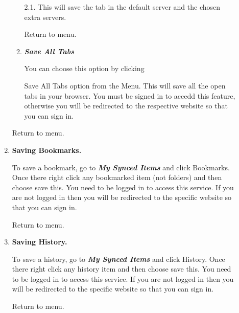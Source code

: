 \documentclass{article}
\begin{document}
\begin{description}
\begin{enumerate}
\begin{enumerate}
												
												
													
													
														2.1. This will save the tab in the default server and the chosen extra servers.
													
												
												 
												
												
											
											Return to menu.
											\item 
												\textbf{\emph{Save All Tabs}}
												\par 
													You can choose this option by clicking 
													
													Save All Tabs
													 option from the Menu.
													 This will save all the open tabs in your browser. You must be signed in to
													accedd this feature, otherwise you will be redirected to the respective website so that
													you can sign in.
												
												
												
											
										
										\end{enumerate}
									
									
										Return to menu.
									\item 
										\textbf{Saving Bookmarks.}
										\par 
											To save a bookmark, go to \textbf{\emph{
											My Synced Items}} and click Bookmarks. Once there right click any bookmarked item
											(not folders) and then choose save this. You need to be logged in to access this service. If you
											are not logged in then you will be redirected to the specific website so that you can sign in.
										
										
										
									
									
										
											Return to menu.
									
									\item 
										\textbf{Saving History.}
										\par 
											To save a history, go to \textbf{\emph{
											My Synced Items}} and click History. Once there right click any history item
											and then choose save this. You need to be logged in to access this service. If you
											are not logged in then you will be redirected to the specific website so that you can sign in.
										
										
									
									
									
										Return to menu.
									
								\end{enumerate}
							
							
							
					\end{description}
				
\end{document}
